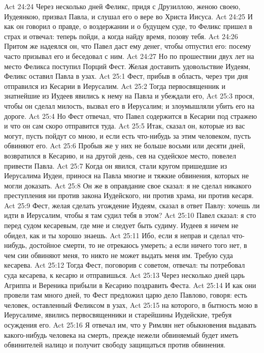 \rsbpar\vs Act 24:24 Через несколько дней Феликс, придя с Друзиллою, женою своею, Иудеянкою, призвал Павла, и слушал его о вере во Христа Иисуса.
\vs Act 24:25 И как он говорил о правде, о воздержании и о будущем суде, то Феликс пришел в страх и отвечал: теперь пойди, а когда найду время, позову тебя.
\vs Act 24:26 Притом же надеялся он, что Павел даст ему денег, чтобы отпустил его: посему часто призывал его и беседовал с ним.
\vs Act 24:27 Но по прошествии двух лет на место Феликса поступил Порций Фест. Желая доставить удовольствие Иудеям, Феликс оставил Павла в узах.
\vs Act 25:1 Фест, прибыв в область, через три дня отправился из Кесарии в Иерусалим.
\vs Act 25:2 Тогда первосвященник и знатнейшие из Иудеев явились к нему  на Павла и убеждали его,
\vs Act 25:3 прося, чтобы он сделал милость, вызвал его в Иерусалим; и злоумышляли убить его на дороге.
\vs Act 25:4 Но Фест отвечал, что Павел содержится в Кесарии под стражею и что он сам скоро отправится туда.
\vs Act 25:5 Итак, сказал он, которые из вас могут, пусть пойдут со мною, и если есть что-нибудь за этим человеком, пусть обвиняют его.
\rsbpar\vs Act 25:6 Пробыв же у них не больше восьми или десяти дней, возвратился в Кесарию, и на другой день, сев на судейское место, повелел привести Павла.
\vs Act 25:7 Когда он явился, стали кругом пришедшие из Иерусалима Иудеи, принося на Павла многие и тяжкие обвинения, которых не могли доказать.
\vs Act 25:8 Он же в оправдание свое сказал: я не сделал никакого преступления ни против закона Иудейского, ни против храма, ни против кесаря.
\vs Act 25:9 Фест, желая сделать угождение Иудеям, сказал в ответ Павлу: хочешь ли идти в Иерусалим, чтобы я там судил тебя в этом?
\vs Act 25:10 Павел сказал: я сто перед судом кесаревым, где мне и следует быть судиму. Иудеев я ничем не обидел, как и ты хорошо знаешь.
\vs Act 25:11 Ибо, если я неправ и сделал что-нибудь, достойное смерти, то не отрекаюсь умереть; а если ничего того нет, в чем сии обвиняют меня, то никто не может выдать меня им. Требую суда кесарева.
\vs Act 25:12 Тогда Фест, поговорив с советом, отвечал: ты потребовал суда кесарева, к кесарю и отправишься.
\rsbpar\vs Act 25:13 Через несколько дней царь Агриппа и Вереника прибыли в Кесарию поздравить Феста.
\vs Act 25:14 И как они провели там много дней, то Фест предложил царю дело Павлово, говоря:  есть человек, оставленный Феликсом в узах,
\vs Act 25:15 на которого, в бытность мою в Иерусалиме,  явились первосвященники и старейшины Иудейские, требуя осуждения его.
\vs Act 25:16 Я отвечал им, что у Римлян нет обыкновения выдавать какого-нибудь человека на смерть, прежде нежели обвиняемый будет иметь обвинителей налицо и получит свободу защищаться против обвинения.
